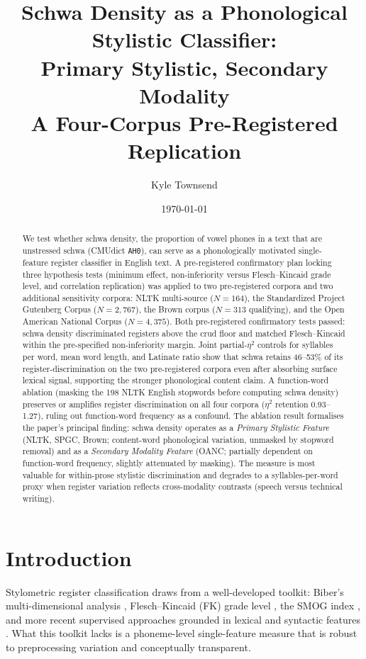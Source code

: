 \documentclass[11pt,a4paper]{article}
\title{Schwa Density as a Phonological Stylistic Classifier:\\
Primary Stylistic, Secondary Modality\\
{\normalsize A Four-Corpus Pre-Registered Replication}}
\author[1]{Kyle Townsend}
\affil[1]{Independent}
\date{\today}
\begin{document}
\maketitle

\begin{abstract}
We test whether schwa density, the proportion of vowel phones in a text
that are unstressed schwa (CMUdict \texttt{AH0}), can serve as a
phonologically motivated single-feature register classifier in English
text. A pre-registered confirmatory plan locking three hypothesis tests
(minimum effect, non-inferiority versus Flesch--Kincaid grade level, and
correlation replication) was applied to two pre-registered corpora and
two additional sensitivity corpora: NLTK multi-source (\(N{=}164\)), the
Standardized Project Gutenberg Corpus (\(N{=}2{,}767\)), the Brown
corpus (\(N{=}313\) qualifying), and the Open American National Corpus
(\(N{=}4{,}375\)). Both pre-registered confirmatory tests passed: schwa
density discriminated registers above the crud floor and matched
Flesch--Kincaid within the pre-specified non-inferiority margin. Joint
partial-\(\eta^2\) controls for syllables per word, mean word length,
and Latinate ratio show that schwa retains 46--53\% of its
register-discrimination on the two pre-registered corpora even after
absorbing surface lexical signal, supporting the stronger phonological
content claim. A function-word ablation (masking the 198 NLTK English
stopwords before computing schwa density) preserves or amplifies
register discrimination on all four corpora (\(\eta^2\) retention
0.93--1.27), ruling out function-word frequency as a confound.
The ablation result formalises the paper's principal finding: schwa
density operates as a \emph{Primary Stylistic Feature} (NLTK, SPGC,
Brown; content-word phonological variation, unmasked by stopword
removal) and as a \emph{Secondary Modality Feature} (OANC; partially
dependent on function-word frequency, slightly attenuated by masking).
The measure is most valuable for within-prose stylistic discrimination
and degrades to a syllables-per-word proxy when register variation
reflects cross-modality contrasts (speech versus technical writing).
\end{abstract}

\section{Introduction}

Stylometric register classification draws from a well-developed
toolkit: Biber's multi-dimensional analysis \citep{biber1988},
Flesch--Kincaid (FK) grade level \citep{kincaid1975}, the SMOG index
\citep{mclaughlin1969}, and more recent supervised approaches grounded
in lexical and syntactic features \citep{grieve2023}. What this toolkit
lacks is a phoneme-level single-feature measure that is robust to
preprocessing variation and conceptually transparent.
\end{document}
